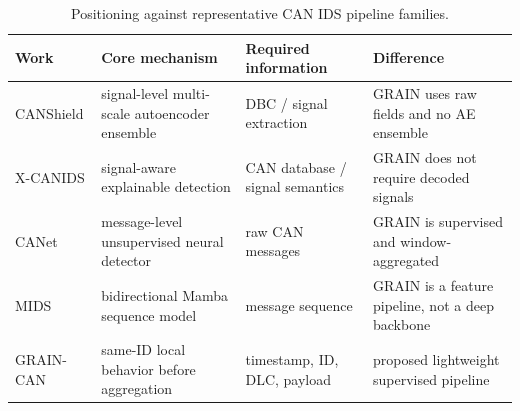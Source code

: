 \begin{table}[H]
\caption{Positioning against representative CAN IDS pipeline families.}\label{tab:positioning}
\centering\small
\begin{tabular}{llll}
\hline
Work & Core mechanism & Required information & Difference \\
\hline
CANShield & signal-level multi-scale autoencoder ensemble & DBC / signal extraction & GRAIN uses raw fields and no AE ensemble \\
X-CANIDS & signal-aware explainable detection & CAN database / signal semantics & GRAIN does not require decoded signals \\
CANet & message-level unsupervised neural detector & raw CAN messages & GRAIN is supervised and window-aggregated \\
MIDS & bidirectional Mamba sequence model & message sequence & GRAIN is a feature pipeline, not a deep backbone \\
GRAIN-CAN & same-ID local behavior before aggregation & timestamp, ID, DLC, payload & proposed lightweight supervised pipeline \\
\hline
\end{tabular}
\end{table}
